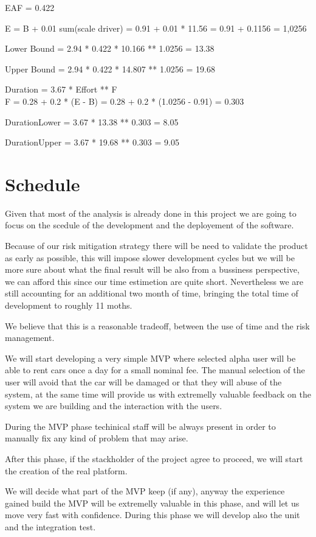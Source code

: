 \documentclass[11pt]{article} %
\begin{document}
EAF = 0.422 

E = B + 0.01 sum(scale driver) = 0.91 + 0.01 * 11.56 = 0.91 + 0.1156 = 1,0256

Lower Bound = 2.94 * 0.422 * 10.166 ** 1.0256 = 13.38

Upper Bound = 2.94 * 0.422 * 14.807 ** 1.0256 = 19.68

Duration = 3.67 * Effort ** F \\

F = 0.28 + 0.2 * (E - B) = 0.28 + 0.2 * (1.0256 - 0.91) = 0.303

DurationLower = 3.67 * 13.38 ** 0.303 = 8.05

DurationUpper = 3.67 * 19.68 ** 0.303 = 9.05


\section{Schedule}

Given that most of the analysis is already done in this project we are going to focus on the scedule of the development and the deployement of the software.

Because of our risk mitigation strategy there will be need to validate the product as early as possible, this will impose slower development cycles but we will be more sure about what the final result will be also from a bussiness perspective, we can afford this since our time estimetion are quite short. Nevertheless we are still accounting for an additional two month of time, bringing the total time of development to roughly 11 moths.

We believe that this is a reasonable tradeoff, between the use of time and the risk management.

We will start developing a very simple MVP where selected alpha user will be able to rent cars once a day for a small nominal fee. The manual selection of the user will avoid that the car will be damaged or that they will abuse of the system, at the same time will provide us with extremelly valuable feedback on the system we are building and the interaction with the users.

During the MVP phase techinical staff will be always present in order to manually fix any kind of problem that may arise.

After this phase, if the stackholder of the project agree to proceed, we will start the creation of the real platform.

We will decide what part of the MVP keep (if any), anyway the experience gained build the MVP will be extremelly valuable in this phase, and will let us move very fast with confidence. 
During this phase we will develop also the unit and the integration test.
\end{document}
